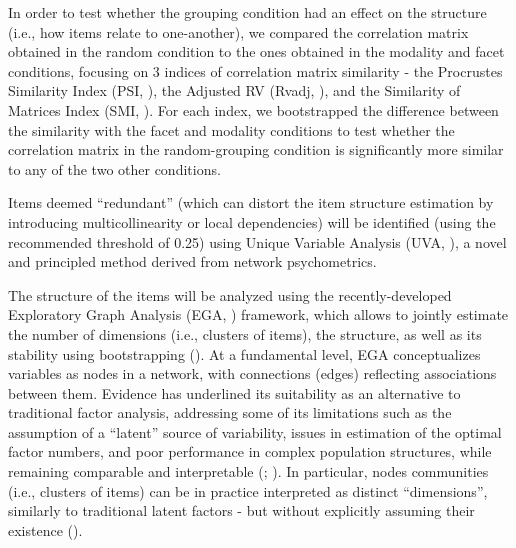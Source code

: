 \documentclass[
  jou,
  floatsintext,
  longtable,
  nolmodern,
  notxfonts,
  notimes,
  colorlinks=true,linkcolor=blue,citecolor=blue,urlcolor=blue]{apa7}
\begin{document}
In order to test whether the grouping condition had an effect on the
structure (i.e., how items relate to one-another), we compared the
correlation matrix obtained in the random condition to the ones obtained
in the modality and facet conditions, focusing on 3 indices of
correlation matrix similarity - the Procrustes Similarity Index (PSI,
), the Adjusted RV (Rvadj,
), and the
Similarity of Matrices Index (SMI,
). For each
index, we bootstrapped the difference between the similarity with the
facet and modality conditions to test whether the correlation matrix in
the random-grouping condition is significantly more similar to any of
the two other conditions.

Items deemed ``redundant'' (which can distort the item structure
estimation by introducing multicollinearity or local dependencies) will
be identified (using the recommended threshold of 0.25) using Unique
Variable Analysis (UVA, ), a novel and principled method derived from network
psychometrics.

The structure of the items will be analyzed using the recently-developed
Exploratory Graph Analysis (EGA, ) framework, which allows to jointly estimate
the number of dimensions (i.e., clusters of items), the structure, as
well as its stability using bootstrapping
(). At a
fundamental level, EGA conceptualizes variables as nodes in a network,
with connections (edges) reflecting associations between them. Evidence
has underlined its suitability as an alternative to traditional factor
analysis, addressing some of its limitations such as the assumption of a
``latent'' source of variability, issues in estimation of the optimal
factor numbers, and poor performance in complex population structures,
while remaining comparable and interpretable
(;
). In
particular, nodes communities (i.e., clusters of items) can be in
practice interpreted as distinct ``dimensions'', similarly to
traditional latent factors - but without explicitly assuming their
existence ().
\end{document}
